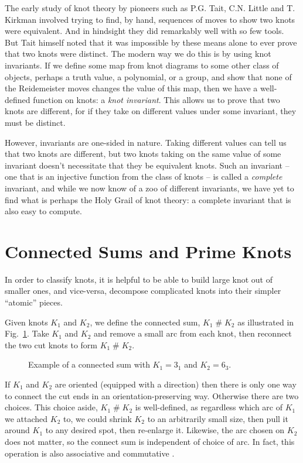 \documentclass[12pt]{report}
\newcommand{\hash}{\ensuremath{\mathbin{\#}}}
\begin{document}
The early study of knot theory by pioneers such as P.G. Tait, C.N. Little and T. Kirkman involved trying to find, by hand, sequences of moves to show two knots were equivalent. And in hindsight they did remarkably well with so few tools. But Tait himself noted that it was impossible by these means alone to ever prove that two knots were distinct. The modern way we do this is by using knot invariants. If we define some map from knot diagrams to some other class of objects, perhaps a truth value, a polynomial, or a group, and show that none of the Reidemeister moves changes the value of this map, then we have a well-defined function on knots: a \textit{knot invariant}. This allows us to prove that two knots are different, for if they take on different values under some invariant, they must be distinct.

However, invariants are one-sided in nature. Taking different values can tell us that two knots are different, but two knots taking on the same value of some invariant doesn't necessitate that they be equivalent knots. Such an invariant -- one that is an injective function from the class of knots -- is called a \textit{complete} invariant, and while we now know of a zoo of different invariants, we have yet to find what is perhaps the Holy Grail of knot theory: a complete invariant that is also easy to compute.


\section{Connected Sums and Prime Knots}
In order to classify knots, it is helpful to be able to build large knot out of smaller ones, and vice-versa, decompose complicated knots into their simpler ``atomic'' pieces.

Given knots $K_{1}$ and $K_{2}$, we define the connected sum, $K_{1} \hash K_{2}$ as illustrated in Fig.~\ref{fig:connected-sum}. Take $K_{1}$ and $K_{2}$ and remove a small arc from each knot, then reconnect the two cut knots to form $K_{1} \hash K_{2}$.

\begin{figure}[hbt]
	\centering
	\def\svgscale{0.5}
	
	\caption{Example of a connected sum with $K_{1} = 3_{1}$ and $K_{2} = 6_{3}$.}
	\label{fig:connected-sum}
\end{figure}


If $K_{1}$ and $K_{2}$ are oriented (equipped with a direction) then there is only one way to connect the cut ends in an orientation-preserving way. Otherwise there are two choices. This choice aside, $K_{1} \hash K_{2}$ is well-defined, as regardless which arc of $K_{1}$ we attached $K_{2}$ to, we could shrink $K_{2}$ to an arbitrarily small size, then pull it around $K_{1}$ to any desired spot, then re-enlarge it. Likewise, the arc chosen on $K_{2}$ does not matter, so the connect sum is independent of choice of arc. In fact, this operation is also associative and commutative \cite[Corollary 7.13]{knots}.
\end{document}
